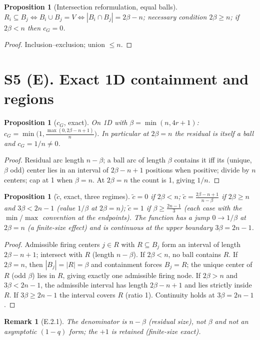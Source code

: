 \documentclass[preprint,12pt]{elsarticle}
\newtheorem{proposition}[theorem]{Proposition}
\newtheorem{remark}{Remark}[theorem]
\newcommand{\ctil}{\tilde{c}}
\newcommand{\cG}{c_G}
\begin{document}
\begin{proposition}[Intersection reformulation, equal balls]
\label{prop:D4}
$R_i\subseteq B_j\iff B_i\cup B_j=V\iff|B_i\cap B_j|=2\beta-n$;
necessary condition $2\beta\ge n$; if $2\beta<n$ then $\cG=0$.
\end{proposition}
\begin{proof}
Inclusion--exclusion; union $\le n$.
\end{proof}

\section{S5 (E). Exact 1D containment and regions}
\label{sec:E}

\begin{proposition}[$\cG$, exact]
\label{prop:E1}
On 1D with $\beta=\min(n,4r+1)$:
$\cG=\min\big(1,\frac{\max(0,2\beta-n+1)}{n}\big)$. In particular at
$2\beta=n$ the residual is itself a ball and $\cG=1/n\neq0$.
\end{proposition}
\begin{proof}
Residual arc length $n-\beta$; a ball arc of length $\beta$ contains it
iff its (unique, $\beta$ odd) center lies in an interval of
$2\beta-n+1$ positions when positive; divide by $n$ centers; cap at 1
when $\beta=n$. At $2\beta=n$ the count is 1, giving $1/n$.
\end{proof}

\begin{proposition}[$\ctil$, exact, three regimes]
\label{prop:E2}
$\ctil=0$ if $2\beta<n$;
$\ctil=\frac{2\beta-n+1}{n-\beta}$ if $2\beta\ge n$ and $3\beta<2n-1$
(value $1/\beta$ at $2\beta=n$); $\ctil=1$ if $\beta\ge\frac{2n-1}{3}$
(each case with the $\min/\max$ convention at the endpoints). The
function has a jump $0\to 1/\beta$ at $2\beta=n$ (a finite-size effect)
and is continuous at the upper boundary $3\beta=2n-1$.
\end{proposition}
\begin{proof}
Admissible firing centers $j\in R$ with $R\subseteq B_j$ form an
interval of length $2\beta-n+1$; intersect with $R$ (length
$n-\beta$). If $2\beta<n$, no ball contains $R$. If $2\beta=n$, then $|B_j|=|R|=\beta$
and containment forces $B_j=R$; the unique center of $R$ (odd $\beta$)
lies in $R$, giving exactly one admissible firing node. If
$2\beta>n$ and $3\beta<2n-1$, the admissible interval has length
$2\beta-n+1$ and lies strictly inside $R$. If $3\beta\ge 2n-1$ the
interval covers $R$ (ratio 1). Continuity holds at $3\beta=2n-1$.
\end{proof}
\begin{remark}[E.2.1]
\label{rem:E2.1}
The denominator is $n-\beta$ (residual size), not $\beta$ and not an
asymptotic $(1-q)$ form; the $+1$ is retained (finite-size exact).
\end{remark}
\end{document}
